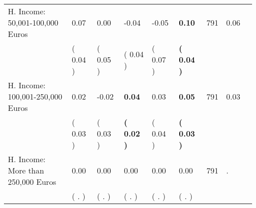 \begin{tabular}{L{6.2cm} C{1.8cm} C{1.8cm} C{1.8cm} C{1.8cm} C{1.8cm} C{1.8cm} C{0.3cm} C{0.3cm}}
H. Income: 50,001-100,000 Euros &      0.07 &      0.00 &     -0.04 &     -0.05 & \textbf{     0.10}  & 791 &       0.06 \\ 
 & (     0.04 ) & (     0.05 ) & (     0.04 ) & (     0.07 ) & \textbf{(     0.04 )}  & \\
H. Income: 100,001-250,000 Euros &      0.02 &     -0.02 & \textbf{     0.04} &      0.03 & \textbf{     0.05}  & 791 &       0.03 \\ 
 & (     0.03 ) & (     0.03 ) & \textbf{(     0.02 )} & (     0.04 ) & \textbf{(     0.03 )}  & \\
H. Income: More than 250,000 Euros &      0.00 &      0.00 &      0.00 &      0.00 &      0.00  & 791 &          . \\ 
 & (        . ) & (        . ) & (        . ) & (        . ) & (        . )  & \\
\bottomrule
\end{tabular}
